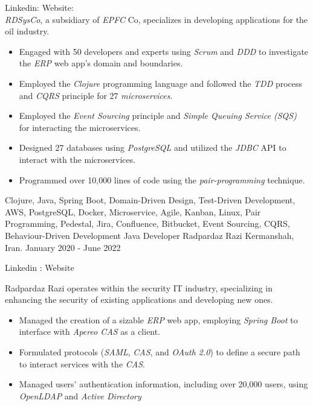 \begin{experiences}
{
  Linkedin: 
  Website: \\
  \emph{RDSysCo}, a subsidiary of \emph{EPFC} Co, specializes in developing applications for the oil industry.
  \begin{itemize}
  \item Engaged with 50 developers and experts using \emph{Scrum} and \emph{DDD} to investigate the \textit{ERP} web app's domain and boundaries.
  \item Employed the \emph{Clojure} programming language and followed the \emph{TDD} process and \textit{CQRS} principle for 27 \emph{microservices}.
  \item Employed the \textit{Event Sourcing} principle and \textit{Simple Queuing Service (SQS)} for interacting the microservices.
  \item Designed 27 databases using \emph{PostgreSQL} and utilized the \emph{JDBC} API to interact with the microservices.
  \item Programmed over 10,000 lines of code using the \emph{pair-programming} technique.
  \end{itemize}}{Clojure, Java, Spring Boot, Domain-Driven Design, Test-Driven Development, AWS, PostgreSQL, Docker, Microservice, Agile, Kanban, Linux, Pair Programming, Pedestal, Jira, Confluence, Bitbucket, Event Sourcing, CQRS, Behaviour-Driven Development}
 \emptySeparator
\experience
{}
{Java Developer}
{Radpardaz Razi}
{Kermanshah, Iran. \hspace{170 pt} January 2020 - June 2022}
{}
{
Linkedin : 
Website 
\par{Radpardaz Razi operates within the security IT industry, specializing in enhancing the security of existing applications and developing new ones.}
\begin{itemize}
\item Managed the creation of a sizable \emph{ERP} web app, employing \emph{Spring Boot} to interface with \emph{Apereo CAS} as a client.
\item Formulated protocols (\emph{SAML}, \emph{CAS}, and \emph{OAuth 2.0}) to define a secure path to interact services with the \textit{CAS}.
\item Managed users' authentication information, including over 20,000 users, using \emph{OpenLDAP} and \emph{Active Directory}

\end{itemize}}
\end{experiences}
